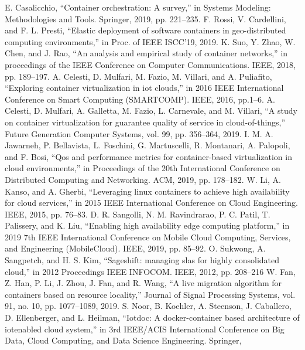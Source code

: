 \cleardoublepage
{}
{}
\begin{thebibliography}{99}

  E. Casalicchio, “Container orchestration: A survey,” in Systems Modeling: Methodologies and Tools. Springer, 2019, pp. 221–235.
 F. Rossi, V. Cardellini, and F. L. Presti, “Elastic deployment of software
containers in geo-distributed computing environments,” in Proc. of IEEE
ISCC’19, 2019.
  K. Suo, Y. Zhao, W. Chen, and J. Rao, “An analysis and empirical
study of container networks,” in proceedings of the IEEE Conference
on Computer Communications. IEEE, 2018, pp. 189–197.
  A. Celesti, D. Mulfari, M. Fazio, M. Villari, and A. Puliafito, “Exploring
container virtualization in iot clouds,” in 2016 IEEE International Conference on Smart Computing (SMARTCOMP). IEEE, 2016, pp.1–6.
  A. Celesti, D. Mulfari, A. Galletta, M. Fazio, L. Carnevale, and
M. Villari, “A study on container virtualization for guarantee quality
of service in cloud-of-things,” Future Generation Computer Systems,
vol. 99, pp. 356–364, 2019.
  I. M. A. Jawarneh, P. Bellavista, L. Foschini, G. Martuscelli, R. Montanari, A. Palopoli, and F. Bosi, “Qos and performance metrics for
container-based virtualization in cloud environments,” in Proceedings
of the 20th International Conference on Distributed Computing and
Networking. ACM, 2019, pp. 178–182.
  W. Li, A. Kanso, and A. Gherbi, “Leveraging linux containers to
achieve high availability for cloud services,” in 2015 IEEE International
Conference on Cloud Engineering. IEEE, 2015, pp. 76–83.
 D. R. Sangolli, N. M. Ravindrarao, P. C. Patil, T. Palissery, and K. Liu,
“Enabling high availability edge computing platform,” in 2019 7th IEEE
International Conference on Mobile Cloud Computing, Services, and
Engineering (MobileCloud). IEEE, 2019, pp. 85–92.
 O. Sukwong, A. Sangpetch, and H. S. Kim, “Sageshift: managing slas
for highly consolidated cloud,” in 2012 Proceedings IEEE INFOCOM.
IEEE, 2012, pp. 208–216
 W. Fan, Z. Han, P. Li, J. Zhou, J. Fan, and R. Wang, “A live migration
algorithm for containers based on resource locality,” Journal of Signal
Processing Systems, vol. 91, no. 10, pp. 1077–1089, 2019.
  S. Noor, B. Koehler, A. Steenson, J. Caballero, D. Ellenberger, and
L. Heilman, “Iotdoc: A docker-container based architecture of iotenabled cloud system,” in 3rd IEEE/ACIS International Conference on
Big Data, Cloud Computing, and Data Science Engineering. Springer,

\end{thebibliography}
